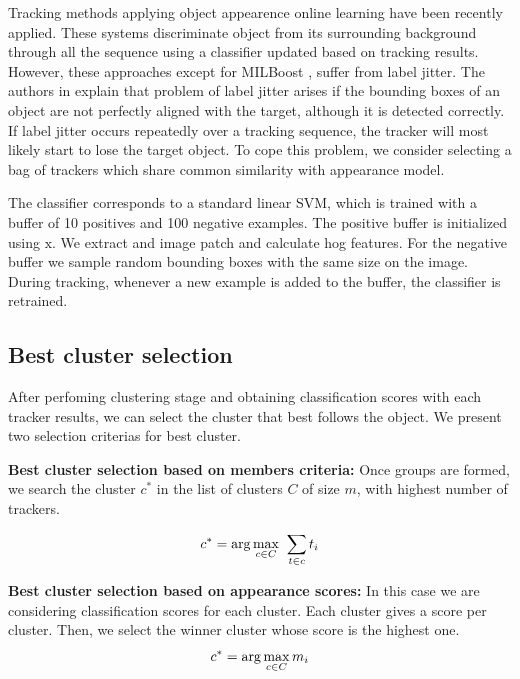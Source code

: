 Tracking methods applying object appearence online learning have been recently applied. These systems discriminate object from its surrounding background through all the sequence using a classifier updated based on tracking results. However, these approaches except for MILBoost \cite{Babenko2010}, suffer from label jitter. The authors in \cite{Santner2010} explain that problem of label jitter arises if the bounding boxes of an object are not perfectly aligned with the target, although it is detected correctly. If label jitter occurs repeatedly over a tracking sequence, the tracker will most likely start to lose the target object. To cope this problem, we consider selecting a bag of trackers which share common similarity with appearance model.

The classifier corresponds to a standard linear SVM, which is trained with a buffer of 10 positives and 100 negative examples. The positive buffer is initialized using $\mathrm{x}$. We extract and image patch and calculate hog features. For the negative buffer we sample random bounding boxes with the same size on the image. During tracking, whenever a new example is added to the buffer, the classifier is retrained.


\subsection{Best cluster selection}

After perfoming clustering stage and obtaining classification scores with each tracker results, we can select the cluster that best follows the object. We present two selection criterias for best cluster.

\textbf{Best cluster selection based on members criteria:} Once groups are formed, we search the cluster $c^{*}$ in the list of clusters $C$ of size $m$, with highest number of trackers.

\begin{equation}
\large
c^{*} = \arg\max_{c\in C} ~\sum_{t \in c}t_{i} 
\end{equation}

\textbf{Best cluster selection based on appearance scores:} In this case we are considering classification scores for each cluster. Each cluster gives a score per cluster. Then, we select the winner cluster whose score is the highest one. 
\begin{equation}
\large
c^{*} = \arg\max_{c\in C} m_{i}
\end{equation}

